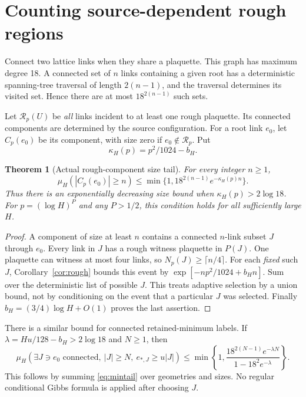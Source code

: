 \documentclass[11pt]{article}
\newtheorem{theorem}{Theorem}[section]
\theoremstyle{remark}
\begin{document}
\section{Counting source-dependent rough regions}
Connect two lattice links when they share a plaquette. This graph has
maximum degree 18. A connected set of $n$ links containing a given root
has a deterministic spanning-tree traversal of length $2(n-1)$, and the
traversal determines its visited set. Hence there are at most
$18^{2(n-1)}$ such sets.

Let $\mathcal R_p(U)$ be \emph{all} links incident to at least one rough
plaquette. Its connected components are determined by the source
configuration. For a root link $e_0$, let $C_p(e_0)$ be its component,
with size zero if $e_0\notin\mathcal R_p$. Put
\begin{equation}
 \kappa_H(p)=p^2/1024-b_H.
 \label{eq:kappa}
\end{equation}

\begin{theorem}[Actual rough-component size tail]\label{thm:components}
For every integer $n\ge1$,
\begin{equation}
 \mu_H(|C_p(e_0)|\ge n)
 \le\min\{1,18^{2(n-1)}e^{-\kappa_H(p)n}\}.
 \label{eq:componenttail}
\end{equation}
Thus there is an exponentially decreasing size bound when
$\kappa_H(p)>2\log18$. For $p=(\log H)^P$ and any $P>1/2$, this condition
holds for all sufficiently large $H$.
\end{theorem}
\begin{proof}
A component of size at least $n$ contains a connected $n$-link subset $J$
through $e_0$. Every link in $J$ has a rough witness plaquette in $P(J)$.
One plaquette can witness at most four links, so
$N_p(J)\ge\lceil n/4\rceil$. For each \emph{fixed} such $J$,
Corollary~\ref{cor:rough} bounds this event by
$\exp[-np^2/1024+b_Hn]$. Sum over the deterministic list of possible
$J$. This treats adaptive selection by a union bound, not by conditioning
on the event that a particular $J$ was selected. Finally
$b_H=(3/4)\log H+O(1)$ proves the last assertion.
\end{proof}

There is a similar bound for connected retained-minimum labels. If
$\lambda=Hu/128-b_H>2\log18$ and $N\ge1$, then
\begin{equation}
 \mu_H\!\left(\exists J\ni e_0\text{ connected},\ |J|\ge N,
          \ e_{*,J}\ge u|J|\right)
 \le\min\left\{1,
 \frac{18^{2(N-1)}e^{-\lambda N}}{1-18^2e^{-\lambda}}\right\}.
 \label{eq:adaptivemin}
\end{equation}
This follows by summing \eqref{eq:mintail} over geometries and sizes.
No regular conditional Gibbs formula is applied after choosing $J$.
\end{document}
